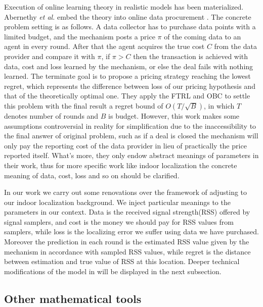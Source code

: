 \documentclass[10pt,conference,compsocconf,letterpaper]{IEEEtran}
\begin{document}
Execution of online learning theory in realistic models has been materialized. Abernethy \emph{et al.} embed the theory into online data procurement \cite{abernethy2015low}. The concrete problem setting is as follows. A data collector has to purchase data points with a limited budget, and the mechanism posts a price $\pi$ of the coming data to an agent in every round. After that the agent acquires the true cost $C$ from the data provider and compare it with $\pi$, if $\pi > C$ then the transaction is achieved with data, cost and loss learned by the mechanism, or else the deal fails with nothing learned. The terminate goal is to propose a pricing strategy reaching the lowest regret, which represents the difference between loss of our pricing hypothesis and that of the theoretically optimal one. They apply the FTRL and OBC to settle this problem with the final result a regret bound of $O(T/\sqrt{B})$, in which $T$ denotes number of rounds and $B$ is budget. However, this work makes some assumptions controversial in reality for simplification due to the inaccessibility to the final answer of original problem, such as if a deal is closed the mechanism will only pay the reporting cost of the data provider in lieu of practically the price reported itself. What’s more, they only endow abstract meanings of parameters in their work, thus for more specific work like indoor localization the concrete meaning of data, cost, loss and so on should be clarified.

In our work we carry out some renovations over the framework of \cite{abernethy2015low} adjusting to our indoor localization background. We inject particular meanings to the parameters in our context. Data is the received signal strength(RSS) offered by signal samplers, and cost is the money we should pay for RSS values from samplers, while loss is the localizing error we suffer using data we have purchased. Moreover the prediction in each round is the estimated RSS value given by the mechanism in accordance with sampled RSS values, while regret is the distance between estimation and true value of RSS at this location. Deeper technical modifications of the model in \cite{abernethy2015low} will be displayed in the next subsection.

\subsection{Other mathematical tools}
\end{document}
